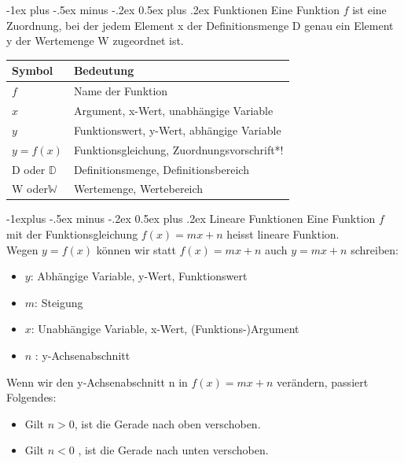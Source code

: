 \documentclass[a4paper,10pt]{article}
\makeatletter
\renewcommand{\section}{\@startsection{section}{1}{0mm}%
                                {-1ex plus -.5ex minus -.2ex}%
                                {0.5ex plus .2ex}%
                                {\normalfont\large\bfseries}}
\renewcommand{\subsection}{\@startsection{subsection}{2}{0mm}%
                                {-1explus -.5ex minus -.2ex}%
                                {0.5ex plus .2ex}%
                                {\normalfont\normalsize\bfseries}}
\makeatother
\begin{document}
\begin{multicols}{3}
    \section{Funktionen}
    Eine Funktion $f$ ist eine Zuordnung, bei der jedem Element x der Definitionsmenge D genau ein Element y der Wertemenge W zugeordnet ist.
    \begin{tabular}{l|l}
        \textbf{Symbol}     & \textbf{Bedeutung}                         \\ \hline
        $f$                 & Name der Funktion                          \\ \hline
        $x$                 & Argument, x-Wert, unabhängige Variable     \\  \hline
        $y$                 & Funktionswert, y-Wert, abhängige Variable  \\  \hline
        $y = f(x)$          & Funktionsgleichung, Zuordnungsvorschrift*! \\ \hline
        D oder $\mathbb{D}$ & Definitionsmenge, Definitionsbereich       \\  \hline
        W oder$\mathbb{W}$  & Wertemenge, Wertebereich                   \\  \hline
    \end{tabular}
    \subsection{Lineare Funktionen}
    Eine Funktion $f$ mit der Funktionsgleichung $f(x) = mx + n$ heisst lineare Funktion. \\
    Wegen $y = f(x)$ können wir statt $f(x) = mx + n$ auch $y = mx + n$ schreiben:
    \begin{itemize}
        \item $y$: Abhängige Variable, y-Wert, Funktionswert
        \item $m$: Steigung
        \item  $x$: Unabhängige Variable, x-Wert, (Funktions-)Argument
        \item $n$ : y-Achsenabschnitt
    \end{itemize}
    Wenn wir den y-Achsenabschnitt n in $f(x) = mx + n$ verändern, passiert Folgendes:
    \begin{itemize}
        \item Gilt $n > 0$, ist die Gerade nach oben verschoben.
        \item Gilt $n < 0$ , ist die Gerade nach unten verschoben.
    \end{itemize}


\end{multicols}
\end{document}
